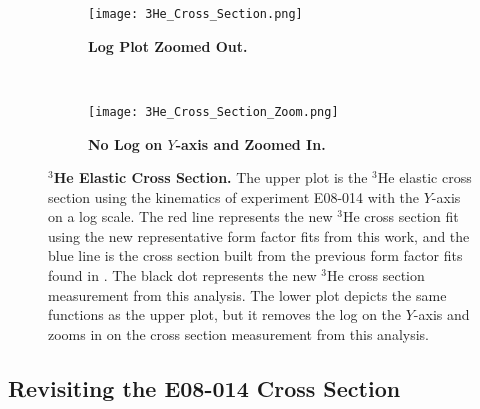 \begin{figure}[!ht]
\begin{subfigure}{1.\textwidth}
  \centering
  \texttt{[image: 3He\_Cross\_Section.png]}
  \caption{\bf{Log Plot Zoomed Out.}}
  \label{fig:3he_cross_section_no_zoom}
\end{subfigure}\\
\begin{subfigure}{1.\textwidth}
  \centering
  \texttt{[image: 3He\_Cross\_Section\_Zoom.png]}
  \caption{\bf{No Log on $Y$-axis and Zoomed In.}}
  \label{fig:3he_cross_section_zoom}
\end{subfigure}
\caption[$^3$He Elastic Cross Section] {
{\bf{$^3$He Elastic Cross Section.}} The upper plot is the $^3$He elastic cross section using the kinematics of experiment E08-014 with the $Y$-axis on a log scale. The red line represents the new $^3$He cross section fit using the new representative form factor fits from this work, and the blue line is the cross section built from the previous form factor fits found in \cite{Article:Amroun}. The black dot represents the new $^3$He cross section measurement from this analysis. The lower plot depicts the same functions as the upper plot, but it removes the log on the $Y$-axis and zooms in on the cross section measurement from this analysis.}
\label{fig:3he_cross_section}
\end{figure}


\subsection{Revisiting the E08-014 Cross Section}
\label{ssec:xs_revisit}

